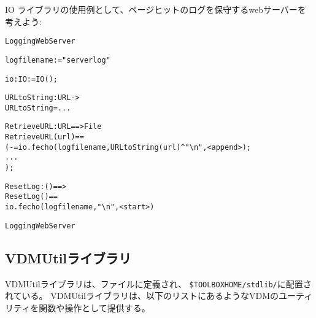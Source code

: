\documentclass[\pformat,12pt]{jarticle}
\begin{document}
IO ライブラリの使用例として、ページヒットのログを保守するwebサーバーを考えよう:
\begin{alltt}
   LoggingWebServer

      logfilename :  = "serverlog"

      io : IO :=  IO();

      URLtoString : URL -> 
      URLtoString = ...

      RetrieveURL : URL ==> File
      RetrieveURL(url) ==
        ( - = io.fecho(logfilename, URLtoString(url)^\verb+"\n"+, <append>);
         ... 
        );

      ResetLog : () ==> 
      ResetLog() ==
        io.fecho(logfilename,\verb+"\n"+,<start>)

   LoggingWebServer
\end{alltt}


\subsection{VDMUtilライブラリ}

VDMUtilライブラリは、ファイルに定義され、
\verb+$TOOLBOXHOME/stdlib/+に配置されている。
VDMUtilライブラリは、以下のリストにあるようなVDMのユーティリティを関数や操作として提供する。
\end{document}

